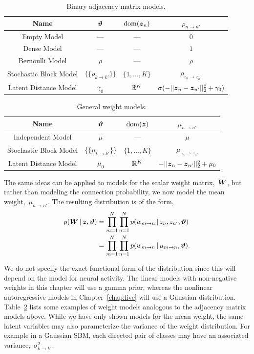 \begin{table}
\begin{center}
\begin{tabular}{c|c|c|c}
Name & $\boldsymbol{\vartheta}$ & $\mathrm{dom}(\boldsymbol{z}_n)$ & $\rho_{n \to n'}$ \\
\hline
Empty Model & --- &  --- & $0$ \\
Dense Model & --- & --- & $1$ \\
Bernoulli Model & $\rho$ & --- & $\rho$ \\
Stochastic Block Model & $\{\{\rho_{k \to k'}\}\}$ & $\{1, \ldots, K\}$ & $\rho_{z_n \to z_{n'}}$ \\
Latent Distance Model & $\gamma_0$ & $\mathbb{R}^K$ & $\sigma(-||\boldsymbol{z}_n - \boldsymbol{z}_{n'}||_2^2 + \gamma_0)$
\end{tabular}
\end{center}
\caption{Binary adjacency matrix models.}
\label{tab:A_models}
\end{table}



\begin{table}
\begin{center}
\begin{tabular}{c|c|c|c}
Name & $\boldsymbol{\vartheta}$ & $\mathrm{dom}(\boldsymbol{z})$ & $\mu_{n \to n'}$ \\
\hline
Independent Model & $\mu$ & --- & $\mu$ \\
Stochastic Block Model & $\{\{ \mu_{k \to k'} \}\}$ & $\{1, \ldots, K\}$ & $\mu_{z_n \to z_{n'}}$ \\
Latent Distance Model & $\mu_0$ & $\mathbb{R}^K$ & $-||\boldsymbol{z}_n - \boldsymbol{z}_{n'}||_2^2 + \mu_0$ 
\end{tabular}
\end{center}
\caption{General weight models.}
\label{tab:W_models}
\end{table}

The same ideas can be applied to models for the scalar weight matrix,~$\boldsymbol{W}$,
but rather than modeling the connection probability, we now model the
mean weight,~$\mu_{n \to n'}$. The resulting distribution is of the form,
\begin{align*}
  p(\boldsymbol{W} \,|\, \boldsymbol{z}, \boldsymbol{\vartheta})
  &= \prod_{m=1}^N \prod_{n=1}^N p(w_{m \to n} \,|\, z_n, z_{n'}, \boldsymbol{\vartheta}) \\
  &= \prod_{m=1}^N \prod_{n=1}^N p(w_{m \to n} \,|\, \mu_{m \to n}, \boldsymbol{\vartheta}).
\end{align*}

We do not specify the exact functional form of the distribution since
this will depend on the model for neural activity. The linear
models with non-negative weights in this chapter will use a gamma
prior, whereas the nonlinear autoregressive models in Chapter~\ref{chap:five} will use a Gaussian
distribution. Table~\ref{tab:W_models} lists some examples of weight
models analogous to the adjacency matrix models above.
While we have only shown models for the mean weight,
the same latent variables may
also parameterize the variance of the weight distribution. For example
in a Gaussian SBM, each directed pair of classes may have an
associated variance,~$\sigma^2_{k \to k'}$.

